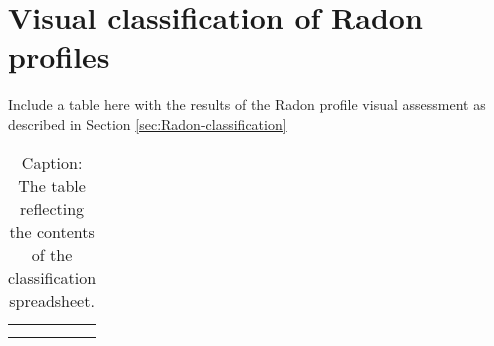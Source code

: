 \section{Visual classification of Radon profiles}
\label{visual-classification-tables}


Include a table here with the results of the Radon profile visual assessment as described in Section \ref{sec:Radon-classification} 

\begin{table}[]
    \centering
    \begin{tabular}{c|c}
         &  \\
         & 
    \end{tabular}
    \caption{Caption: The table reflecting the contents of the classification spreadsheet.}
    \label{tab:visual-class-table}
\end{table}


